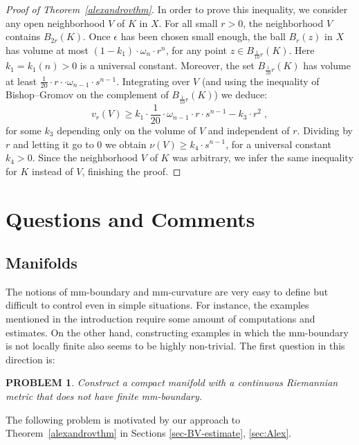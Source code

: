 \documentclass[12pt,leqno]{amsart}
\numberwithin{equation}{section}
\newtheorem{quest}[thm]{PROBLEM}
\theoremstyle{definition}
\theoremstyle{remark}
\newcommand{\tref}[1]{Theorem~\ref{#1}}
\begin{document}
\begin{proof}[Proof of Theorem~\ref{alexandrovthm}]
	In order to prove this inequality, we consider any open neighborhood $V$ of $K$ in $X$.   For all small $r>0$, the neighborhood $V$ contains $B_{2r} (K)$.  Once $\epsilon$ has been chosen small enough,   the ball   $B_r (z)$ in $X$ has  volume at most
   $ (1-k_1)  \cdot \omega _n \cdot  r^n$,  for
	any point $z\in  B_{\frac 1 {10} r} (K)$. Here  $ k_1=k_1(n)>0 $ is a universal constant.
	 Moreover,  the set  $B_{\frac 1 {10} r} (K)$  has volume at least $\frac 1 {20} \cdot r\cdot \cdot \omega _{n-1} \cdot   s^{n-1}$.
	Integrating over $V$  (and using the inequality of Bishop--Gromov on the complement of   $B_{\frac 1 {10} r} (K)$) we deduce:
	$$v_r (V) \geq k_1\cdot \frac 1 {20} \cdot \omega _{n-1}  \cdot r\cdot s^{n-1}  -  k_3 \cdot r^2 \;,$$
	for some $k_3$ depending only on the volume of $V$ and independent of $r$.
	Dividing by $r$ and letting it go to $0$ we obtain $\nu (V) \geq k_4\cdot s^{n-1}$, for a universal constant $k_4>0$.
 Since the neighborhood $V$ of $K$ was arbitrary,
	we infer the same inequality for $K$ instead of $V$, finishing the proof.
\end{proof}














\section{Questions and Comments} \label{sec:final}
\subsection{Manifolds}
The notions of mm-boundary and mm-curvature are very easy to define but   difficult to control even in  simple situations.
For instance, the examples mentioned in the introduction require some amount of computations and estimates.  On the other hand, constructing examples in which the mm-boundary is not locally finite  also seems to be highly non-trivial.  The first  question in this direction is:


\begin{quest}
 Construct a compact manifold with a continuous Riemannian metric
that does not have finite mm-boundary.
\end{quest}

 The following problem is motivated by our approach to \tref{alexandrovthm} in Sections \ref{sec-BV-estimate}, \ref{sec:Alex}.
\end{document}
